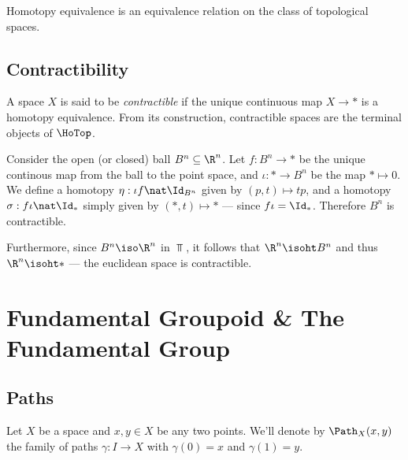 \begin{corollary}
\label{cor:htpy-equiv-is-equiv-relation}
Homotopy equivalence is an equivalence relation on the class of topological
spaces.
\end{corollary}

\subsection{Contractibility}

\begin{definition}
\label{def:contractible-space}
A space \(X\) is said to be \emph{contractible} if the unique continuous map
\(X \to *\) is a homotopy equivalence. From its construction, contractible
spaces are the terminal objects of \(\HoTop\).
\end{definition}

\begin{example}
\label{exp:ball-contractible}
Consider the open (or closed) ball \(B^n \subseteq \R^n\). Let \(f: B^n \to *\)
be the unique continous map from the ball to the point space, and
\(\iota: * \to B^n\) be the map \(* \mapsto 0\). We define a homotopy
\(\eta: \iota f \nat \Id_{B^n}\) given by \((p, t) \mapsto t p\), and a homotopy
\(\sigma: f \iota \nat \Id_{*}\) simply given by \((*, t) \mapsto *\) --- since
\(f \iota = \Id_{*}\). Therefore \(B^n\) is contractible.

Furthermore, since \(B^n \iso \R^n\) in \(\Top\), it follows that \(\R^n \isoht
B^n\) and thus \(\R^n \isoht *\) --- the euclidean space is contractible.
\end{example}

\section{Fundamental Groupoid \& The Fundamental Group}

\subsection{Paths}

\begin{notation}
\label{not:family-of-paths}
Let \(X\) be a space and \(x, y \in X\) be any two points. We'll denote by
\(\Path_X(x, y)\) the family of paths \(\gamma: I \to X\) with \(\gamma(0) = x\) and \(\gamma(1) = y\).
\end{notation}

